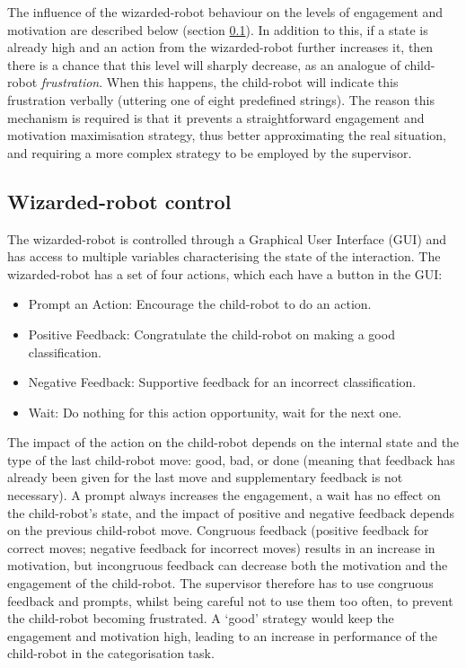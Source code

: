 The influence of the wizarded-robot behaviour on the levels of engagement and motivation are described below (section \ref{sec:wizarded-robot}). In addition to this, if a state is already high and an action from the wizarded-robot further increases it, then there is a chance that this level will sharply decrease, as an analogue of child-robot \textit{frustration}.
When this happens, the child-robot will indicate this frustration verbally (uttering one of eight predefined strings).
The reason this mechanism is required is that it prevents a straightforward engagement and motivation maximisation strategy, thus better approximating the real situation, and requiring a more complex strategy to be employed by the supervisor.

\subsection{Wizarded-robot control}
\label{sec:wizarded-robot}
The wizarded-robot is controlled through a Graphical User Interface (GUI) and has access to multiple variables characterising the state of the interaction. 
The wizarded-robot has a set of four actions, which each have a button in the GUI: 
\begin{itemize}
	\item Prompt an Action: Encourage the child-robot to do an action.
	\item Positive Feedback: Congratulate the child-robot on making a good classification.
	\item Negative Feedback: Supportive feedback for an incorrect classification.
	\item Wait: Do nothing for this action opportunity, wait for the next one.
\end{itemize}

The impact of the action on the child-robot depends on the internal state and the type of the last child-robot move: good, bad, or done (meaning that feedback has already been given for the last move and supplementary feedback is not necessary). 
A prompt always increases the engagement, a wait has no effect on the child-robot's state, and the impact of positive and negative feedback depends on the previous child-robot move.
Congruous feedback (positive feedback for correct moves; negative feedback for incorrect moves) results in an increase in motivation, but incongruous feedback can decrease both the motivation and the engagement of the child-robot.
The supervisor therefore has to use congruous feedback and prompts, whilst being careful not to use them too often, to prevent the child-robot becoming frustrated.
A `good' strategy would keep the engagement and motivation high, leading to an increase in performance of the child-robot in the categorisation task.

